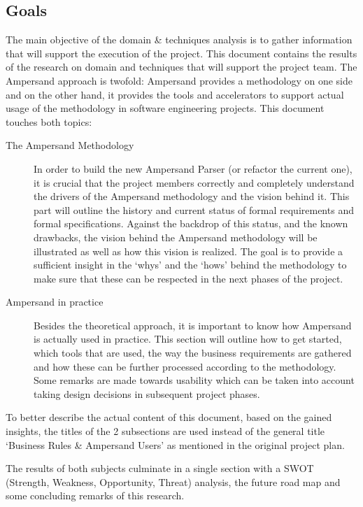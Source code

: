 \subsection{Goals}
The main objective of the domain \& techniques analysis is to gather information that will support the execution of the project.
This document contains the results of the research on domain and techniques that will support the project team.
The Ampersand approach is twofold: Ampersand provides a methodology on one side and on the other hand, it provides the tools and accelerators to support actual usage of the methodology in software engineering projects.
This document touches both topics:
\begin{description}
	\item[The Ampersand Methodology]
	In order to build the new Ampersand Parser (or refactor the current one), it is crucial that the project members correctly and completely understand the drivers of the Ampersand methodology and the vision behind it.
	This part will outline the history and current status of formal requirements and formal specifications.
	 Against the backdrop of this status, and the known drawbacks, the vision behind the Ampersand methodology will be illustrated as well as how this vision is realized.
	The goal is to provide a sufficient insight in the `whys' and the `hows' behind the methodology to make sure that these can be respected in the next phases of the project.
	
	\item[Ampersand in practice]
	Besides the theoretical approach, it is important to know how Ampersand is actually used in practice. This section will outline how to get started, which tools that are used, the way the business requirements are gathered and how these can be further processed according to the methodology. Some remarks are made towards usability which can be taken into account taking design decisions in subsequent project phases.

\end{description}
To better describe the actual content of this document, based on the gained insights, the titles of the 2 subsections are used instead of the general title `Business Rules \& Ampersand Users' as mentioned in the original project plan.

The results of both subjects culminate in a single section with a SWOT (Strength, Weakness, Opportunity, Threat) analysis, the future road map and some concluding remarks of this research.

